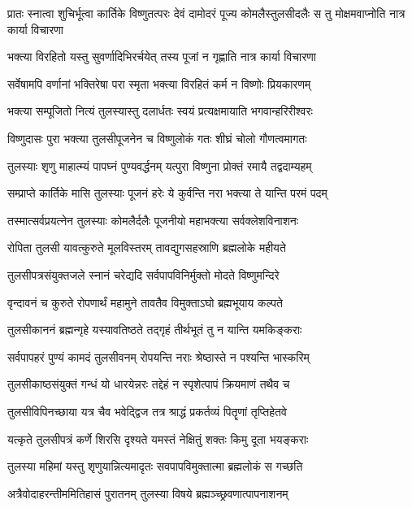 \threelineshloka
{प्रातः स्नात्वा शुचिर्भूत्वा कार्तिके विष्णुतत्परः}
{देवं दामोदरं पूज्य कोमलैस्तुलसीदलैः}
{स तु मोक्षमवाप्नोति नात्र कार्या विचारणा} %

\twolineshloka
{भक्त्या विरहितो यस्तु सुवर्णादिभिरर्चयेत्}
{तस्य पूजां न गृह्णाति नात्र कार्या विचारणा} %

\twolineshloka
{सर्वेषामपि वर्णानां भक्तिरेषा परा स्मृता}
{भक्त्या विरहितं कर्म न विष्णोः प्रियकारणम्} %

\twolineshloka
{भक्त्या सम्पूजितो नित्यं तुलस्यास्तु दलार्धतः}
{स्वयं प्रत्यक्षमायाति भगवान्हरिरीश्वरः} %

\twolineshloka
{विष्णुदासः पुरा भक्त्या तुलसीपूजनेन च}
{विष्णुलोकं गतः शीघ्रं चोलो गौणत्वमागतः} %

\twolineshloka
{तुलस्याः शृणु माहात्म्यं पापघ्नं पुण्यवर्द्धनम्}
{यत्पुरा विष्णुना प्रोक्तं रमायै तद्वदाम्यहम्} %

\twolineshloka
{सम्प्राप्ते कार्तिके मासि तुलस्याः पूजनं हरेः}
{ये कुर्वन्ति नरा भक्त्या ते यान्ति परमं पदम्} %

\twolineshloka
{तस्मात्सर्वप्रयत्नेन तुलस्याः कोमलैर्दलैः}
{पूजनीयो महाभक्त्या सर्वक्लेशविनाशनः} %

\twolineshloka
{रोपिता तुलसी यावत्कुरुते मूलविस्तरम्}
{तावद्युगसहस्राणि ब्रह्मलोके महीयते} %

\twolineshloka
{तुलसीपत्रसंयुक्तजले स्नानं चरेद्यदि}
{सर्वपापविनिर्मुक्तो मोदते विष्णुमन्दिरे} %

\twolineshloka
{वृन्दावनं च कुरुते रोपणार्थं महामुने}
{तावतैव विमुक्ताऽघो ब्रह्मभूयाय कल्पते} %

\twolineshloka
{तुलसीकाननं ब्रह्मन्गृहे यस्यावतिष्ठते}
{तद्गृहं तीर्थभूतं तु न यान्ति यमकिङ्कराः} %

\twolineshloka
{सर्वपापहरं पुण्यं कामदं तुलसीवनम्}
{रोपयन्ति नराः श्रेष्ठास्ते न पश्यन्ति भास्करिम्} %

\twolineshloka
{तुलसीकाष्ठसंयुक्तं गन्धं यो धारयेन्नरः}
{तद्देहं न स्पृशेत्पापं क्रियमाणं तथैव च} %

\twolineshloka
{तुलसीविपिनच्छाया यत्र चैव भवेद्द्विज}
{तत्र श्राद्धं प्रकर्तव्यं पितॄणां तृप्तिहेतवे} %

\twolineshloka
{यत्कृते तुलसीपत्रं कर्णे शिरसि दृश्यते}
{यमस्तं नेक्षितुं शक्तः किमु दूता भयङ्कराः} %

\twolineshloka
{तुलस्या महिमां यस्तु शृणुयान्नित्यमादृतः}
{सवपापविमुक्तात्मा ब्रह्मलोकं स गच्छति} %

\twolineshloka
{अत्रैवोदाहरन्तीममितिहासं पुरातनम्}
{तुलस्या विषये ब्रह्मञ्च्छ्रवणात्पापनाशनम्} %

